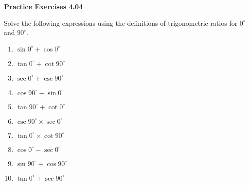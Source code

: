 \vspace{0.3ex}
\noindent\textbf{Practice Exercises 4.04}

\vspace{0.2ex}

Solve the following expressions using the definitions of trigonometric ratios for \( 0^\circ \) and \( 90^\circ \).
\begin{multicols}{2}
\begin{enumerate}
    \item \( \sin 0^\circ + \cos 0^\circ \)
    \item \( \tan 0^\circ + \cot 90^\circ \)
    \item \( \sec 0^\circ + \csc 90^\circ \)
    \item \( \cos 90^\circ - \sin 0^\circ \)
    \item \( \tan 90^\circ + \cot 0^\circ \)
    \item \( \csc 90^\circ \times \sec 0^\circ \)
    \item \( \tan 0^\circ \times \cot 90^\circ \)
    \item \( \cos 0^\circ - \sec 0^\circ \)
    \item \( \sin 90^\circ + \cos 90^\circ \)
    \item \( \tan 0^\circ + \sec 90^\circ \)
\end{enumerate}
\end{multicols}
